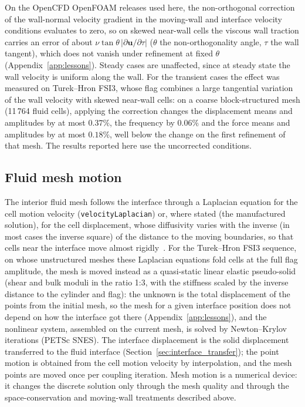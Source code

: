 On the OpenCFD OpenFOAM releases used here, the non-orthogonal correction of the wall-normal velocity gradient in the moving-wall and interface velocity conditions evaluates to zero, so on skewed near-wall cells the viscous wall traction carries an error of about $\nu\tan\theta\,|\partial\mathbf{u}/\partial\tau|$ ($\theta$ the non-orthogonality angle, $\tau$ the wall tangent), which does not vanish under refinement at fixed $\theta$ (Appendix~\ref{app:lessons}). Steady cases are unaffected, since at steady state the wall velocity is uniform along the wall. For the transient cases the effect was measured on Turek--Hron FSI3, whose flag combines a large tangential variation of the wall velocity with skewed near-wall cells: on a coarse block-structured mesh (11\,764 fluid cells), applying the correction changes the displacement means and amplitudes by at most $0.37\%$, the frequency by $0.06\%$ and the force means and amplitudes by at most $0.18\%$, well below the change on the first refinement of that mesh. The results reported here use the uncorrected conditions.

\subsection{Fluid mesh motion}\label{sec:fluid_mesh_motion}

The interior fluid mesh follows the interface through a Laplacian equation for the cell motion velocity (\texttt{velocityLaplacian}) or, where stated (the manufactured solution), for the cell displacement, whose diffusivity varies with the inverse (in most cases the inverse square) of the distance to the moving boundaries, so that cells near the interface move almost rigidly~\citep{Tukovic2018}.
For the Turek--Hron FSI3 sequence, on whose unstructured meshes these Laplacian equations fold cells at the full flag amplitude, the mesh is moved instead as a quasi-static linear elastic pseudo-solid (shear and bulk moduli in the ratio 1:3, with the stiffness scaled by the inverse distance to the cylinder and flag): the unknown is the total displacement of the points from the initial mesh, so the mesh for a given interface position does not depend on how the interface got there (Appendix~\ref{app:lessons}), and the nonlinear system, assembled on the current mesh, is solved by Newton--Krylov iterations (PETSc SNES).
The interface displacement is the solid displacement transferred to the fluid interface (Section~\ref{sec:interface_transfer}); the point motion is obtained from the cell motion velocity by interpolation, and the mesh points are moved once per coupling iteration.
Mesh motion is a numerical device: it changes the discrete solution only through the mesh quality and through the space-conservation and moving-wall treatments described above.


